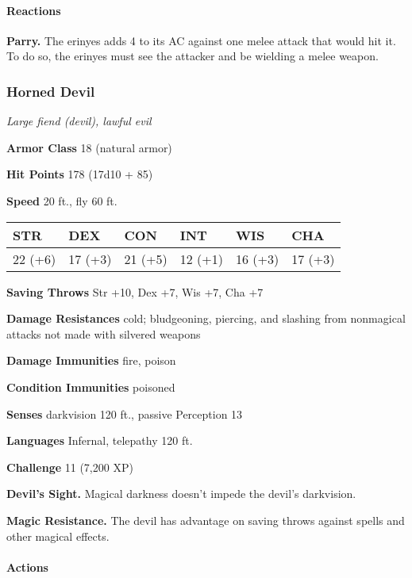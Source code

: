 \documentclass[
]{article}
\begin{document}
\hypertarget{reactions-2}{%
\paragraph{Reactions}\label{reactions-2}}

\textbf{Parry.} The erinyes adds 4 to its AC against one melee attack
that would hit it. To do so, the erinyes must see the attacker and be
wielding a melee weapon.

\hypertarget{horned-devil}{%
\subsubsection{Horned Devil}\label{horned-devil}}

\emph{Large fiend (devil), lawful evil}

\textbf{Armor Class} 18 (natural armor)

\textbf{Hit Points} 178 (17d10 + 85)

\textbf{Speed} 20 ft., fly 60 ft.

\begin{longtable}[]{@{}llllll@{}}
\toprule
STR & DEX & CON & INT & WIS & CHA\tabularnewline
\midrule
\endhead
22 (+6) & 17 (+3) & 21 (+5) & 12 (+1) & 16 (+3) & 17 (+3)\tabularnewline
\bottomrule
\end{longtable}

\textbf{Saving Throws} Str +10, Dex +7, Wis +7, Cha +7

\textbf{Damage Resistances} cold; bludgeoning, piercing, and slashing
from nonmagical attacks not made with silvered weapons

\textbf{Damage Immunities} fire, poison

\textbf{Condition Immunities} poisoned

\textbf{Senses} darkvision 120 ft., passive Perception 13

\textbf{Languages} Infernal, telepathy 120 ft.

\textbf{Challenge} 11 (7,200 XP)

\textbf{Devil's Sight.} Magical darkness doesn't impede the devil's
darkvision.

\textbf{Magic Resistance.} The devil has advantage on saving throws
against spells and other magical effects.

\hypertarget{actions-14}{%
\paragraph{Actions}\label{actions-14}}
\end{document}
